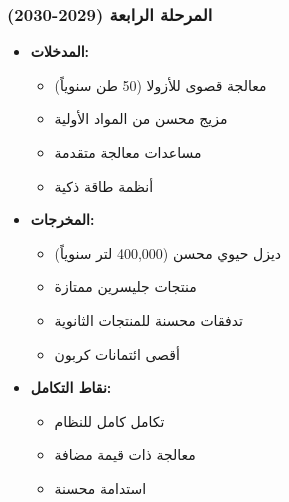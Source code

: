 \subsubsection{المرحلة الرابعة (2029-2030)}
\begin{itemize}
    \item \textbf{المدخلات:}
    \begin{itemize}
        \item معالجة قصوى للأزولا (50 طن سنوياً)
        \item مزيج محسن من المواد الأولية
        \item مساعدات معالجة متقدمة
        \item أنظمة طاقة ذكية
    \end{itemize}
    \item \textbf{المخرجات:}
    \begin{itemize}
        \item ديزل حيوي محسن (400,000 لتر سنوياً)
        \item منتجات جليسرين ممتازة
        \item تدفقات محسنة للمنتجات الثانوية
        \item أقصى ائتمانات كربون
    \end{itemize}
    \item \textbf{نقاط التكامل:}
    \begin{itemize}
        \item تكامل كامل للنظام
        \item معالجة ذات قيمة مضافة
        \item استدامة محسنة
    \end{itemize}
\end{itemize}

